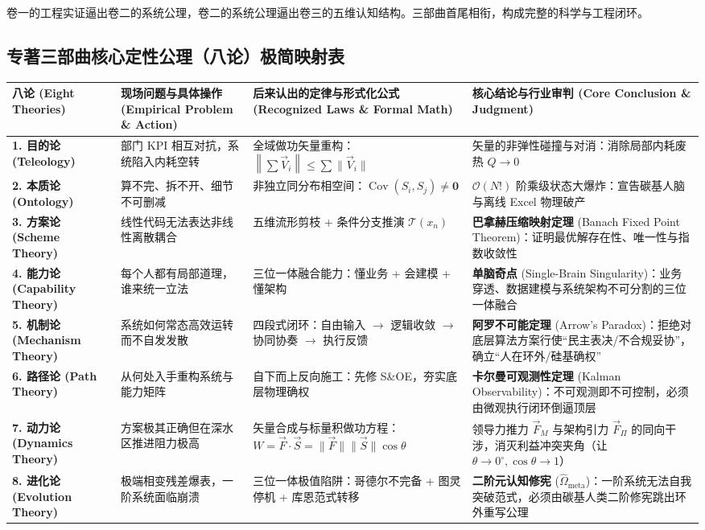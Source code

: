 \documentclass[11pt,a4paper,oneside]{ctexart}
\begin{document}
卷一的工程实证逼出卷二的系统公理，卷二的系统公理逼出卷三的五维认知结构。三部曲首尾相衔，构成完整的科学与工程闭环。


\subsection{专著三部曲核心定性公理（八论）极简映射表}

\begin{table}[htbp]
\centering
\small
\begin{tabular}{p{2.5cm}p{3.5cm}p{4.2cm}p{4.2cm}}
\toprule
八论 (Eight Theories) & 现场问题与具体操作 (Empirical Problem \& Action) & 后来认出的定律与形式化公式 (Recognized Laws \& Formal Math) & 核心结论与行业审判 (Core Conclusion \& Judgment) \\
\midrule
\textbf{1. 目的论 (Teleology)} & 部门 KPI 相互对抗，系统陷入内耗空转 & 全域做功矢量重构：$\left\|\sum \vec{V}_i\right\| \le \sum \|\vec{V}_i\|$ & 矢量的非弹性碰撞与对消：消除局部内耗废热 $Q \to 0$ \\
\textbf{2. 本质论 (Ontology)} & 算不完、拆不开、细节不可删减 & 非独立同分布相空间：$\operatorname{Cov}(S_i, S_j) \neq \mathbf{0}$ & $\mathcal{O}(N!)$ 阶乘级状态大爆炸：宣告碳基人脑与离线 Excel 物理破产 \\
\textbf{3. 方案论 (Scheme Theory)} & 线性代码无法表达非线性离散耦合 & 五维流形剪枝 + 条件分支推演 $\mathcal{T}(x_n)$ & \textbf{巴拿赫压缩映射定理} (Banach Fixed Point Theorem)：证明最优解存在性、唯一性与指数收敛性 \\
\textbf{4. 能力论 (Capability Theory)} & 每个人都有局部道理，谁来统一立法 & 三位一体融合能力：懂业务 + 会建模 + 懂架构 & \textbf{单脑奇点} (Single-Brain Singularity)：业务穿透、数据建模与系统架构不可分割的三位一体融合 \\
\textbf{5. 机制论 (Mechanism Theory)} & 系统如何常态高效运转而不自发发散 & 四段式闭环：自由输入 $\to$ 逻辑收敛 $\to$ 协同协奏 $\to$ 执行反馈 & \textbf{阿罗不可能定理} (Arrow's Paradox)：拒绝对底层算法方案行使“民主表决/不合规妥协”，确立“人在环外/硅基确权” \\
\textbf{6. 路径论 (Path Theory)} & 从何处入手重构系统与能力矩阵 & 自下而上反向施工：先修 S\&OE，夯实底层物理确权 & \textbf{卡尔曼可观测性定理} (Kalman Observability)：不可观测即不可控制，必须由微观执行闭环倒逼顶层 \\
\textbf{7. 动力论 (Dynamics Theory)} & 方案极其正确但在深水区推进阻力极高 & 矢量合成与标量积做功方程：$W = \vec{F} \cdot \vec{S} = \|\vec{F}\| \|\vec{S}\| \cos\theta$ & 领导力推力 $\vec{F}_M$ 与架构引力 $\vec{F}_\Pi$ 的同向干涉，消灭利益冲突夹角（让 $\theta \to 0^\circ, \cos\theta \to 1$） \\
\textbf{8. 进化论 (Evolution Theory)} & 极端相变残差爆表，一阶系统面临崩溃 & 三位一体极值陷阱：哥德尔不完备 + 图灵停机 + 库恩范式转移 & \textbf{二阶元认知修宪} ($\hat{\Omega}_{\text{meta}}$)：一阶系统无法自我突破范式，必须由碳基人类二阶修宪跳出环外重写公理 \\
\bottomrule
\end{tabular}
\end{table}
\end{document}
